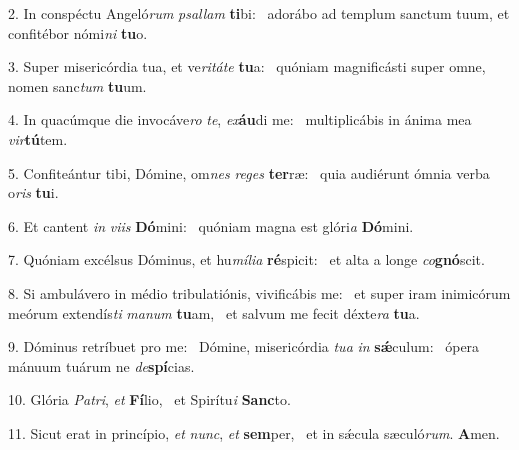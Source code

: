 2. In conspéctu Angeló\textit{rum} \textit{psal}\textit{lam} \textbf{ti}bi: \ast\  adorábo ad templum sanctum tuum, et confitébor nómi\textit{ni} \textbf{tu}o.\

3. Super misericórdia tua, et ve\textit{ri}\textit{tá}\textit{te} \textbf{tu}a: \ast\  quóniam magnificásti super omne, nomen sanc\textit{tum} \textbf{tu}um.\

4. In quacúmque die invocáve\textit{ro} \textit{te}, \textit{ex}\textbf{áu}di me: \ast\  multiplicábis in ánima mea \textit{vir}\textbf{tú}tem.\

5. Confiteántur tibi, Dómine, om\textit{nes} \textit{re}\textit{ges} \textbf{ter}ræ: \ast\  quia audiérunt ómnia verba o\textit{ris} \textbf{tu}i.\

6. Et cantent \textit{in} \textit{vi}\textit{is} \textbf{Dó}mini: \ast\  quóniam magna est glóri\textit{a} \textbf{Dó}mini.\

7. Quóniam excélsus Dóminus, et hu\textit{mí}\textit{li}\textit{a} \textbf{ré}spicit: \ast\  et alta a longe \textit{co}\textbf{gnó}scit.\

8. Si ambulávero in médio tribulatiónis, vivificábis me: \dag\  et super iram inimicórum meórum extendís\textit{ti} \textit{ma}\textit{num} \textbf{tu}am, \ast\  et salvum me fecit déxte\textit{ra} \textbf{tu}a.\

9. Dóminus retríbuet pro me: \dag\  Dómine, misericórdia \textit{tu}\textit{a} \textit{in} \textbf{sǽ}culum: \ast\  ópera mánuum tuárum ne \textit{de}\textbf{spí}cias.\

10. Glória \textit{Pa}\textit{tri}, \textit{et} \textbf{Fí}lio, \ast\  et Spirítu\textit{i} \textbf{Sanc}to.\

11. Sicut erat in princípio, \textit{et} \textit{nunc}, \textit{et} \textbf{sem}per, \ast\  et in sǽcula sæculó\textit{rum}. \textbf{A}men.\

